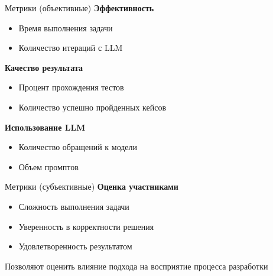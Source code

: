 \documentclass[14pt,aspectratio=169]{beamer}
\begin{document}
\begin{frame}{Метрики (объективные)}
\textbf{Эффективность}
\begin{itemize}
    \item Время выполнения задачи
    \item Количество итераций с LLM
\end{itemize}

\vspace{0.5em}

\textbf{Качество результата}
\begin{itemize}
    \item Процент прохождения тестов
    \item Количество успешно пройденных кейсов
\end{itemize}

\vspace{0.5em}

\textbf{Использование LLM}
\begin{itemize}
    \item Количество обращений к модели
    \item Объем промптов
\end{itemize}
\end{frame}

\begin{frame}{Метрики (субъективные)}
\textbf{Оценка участниками}
\begin{itemize}
    \item Сложность выполнения задачи
    \item Уверенность в корректности решения
    \item Удовлетворенность результатом
\end{itemize}

\vspace{0.5em}

Позволяют оценить влияние подхода на восприятие процесса разработки
\end{frame}
\end{document}
